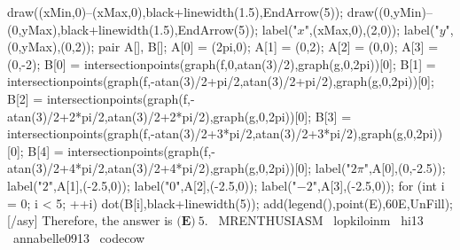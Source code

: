 \documentclass[12pt]{article}
\begin{document}
draw((xMin,0)--(xMax,0),black+linewidth(1.5),EndArrow(5)); draw((0,yMin)--(0,yMax),black+linewidth(1.5),EndArrow(5)); label("$x$",(xMax,0),(2,0)); label("$y$",(0,yMax),(0,2)); pair A[], B[]; A[0] = (2pi,0); A[1] = (0,2); A[2] = (0,0); A[3] = (0,-2); B[0] = intersectionpoints(graph(f,0,atan(3)/2),graph(g,0,2pi))[0]; B[1] = intersectionpoints(graph(f,-atan(3)/2+pi/2,atan(3)/2+pi/2),graph(g,0,2pi))[0]; B[2] = intersectionpoints(graph(f,-atan(3)/2+2*pi/2,atan(3)/2+2*pi/2),graph(g,0,2pi))[0]; B[3] = intersectionpoints(graph(f,-atan(3)/2+3*pi/2,atan(3)/2+3*pi/2),graph(g,0,2pi))[0]; B[4] = intersectionpoints(graph(f,-atan(3)/2+4*pi/2,atan(3)/2+4*pi/2),graph(g,0,2pi))[0]; label("$2\pi$",A[0],(0,-2.5)); label("$2$",A[1],(-2.5,0)); label("$0$",A[2],(-2.5,0)); label("$-2$",A[3],(-2.5,0)); for (int i = 0; i < 5; ++i) { dot(B[i],black+linewidth(5)); } add(legend(),point(E),60E,UnFill); [/asy] Therefore, the answer is $\boxed{\textbf{(E)}\ 5}.$ ~MRENTHUSIASM ~lopkiloinm ~hi13 ~annabelle0913 ~codecow
\end{document}

